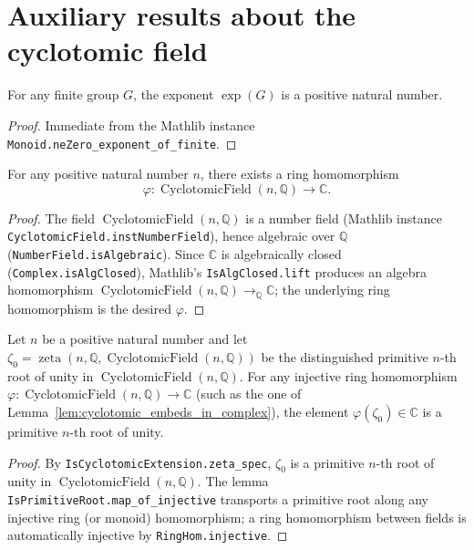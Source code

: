 \section{Auxiliary results about the cyclotomic field}

\begin{lemma}
    \label{lem:exponent_pos}
    For any finite group $G$, the exponent $\operatorname{exp}(G)$ is
    a positive natural number.
\end{lemma}
\begin{proof}
    Immediate from the Mathlib instance
    \texttt{Monoid.neZero\_exponent\_of\_finite}.
\end{proof}

\begin{lemma}
    \label{lem:cyclotomic_embeds_in_complex}
    For any positive natural number $n$, there exists a ring
    homomorphism
    \[
        \varphi : \operatorname{CyclotomicField}(n,\mathbb{Q})
            \longrightarrow \mathbb{C}.
    \]
\end{lemma}
\begin{proof}
    The field $\operatorname{CyclotomicField}(n,\mathbb{Q})$ is a
    number field (Mathlib instance
    \texttt{CyclotomicField.instNumberField}), hence algebraic over
    $\mathbb{Q}$ (\texttt{NumberField.isAlgebraic}). Since
    $\mathbb{C}$ is algebraically closed
    (\texttt{Complex.isAlgClosed}), Mathlib's
    \texttt{IsAlgClosed.lift} produces an algebra homomorphism
    $\operatorname{CyclotomicField}(n,\mathbb{Q}) \to_{\mathbb{Q}}
    \mathbb{C}$; the underlying ring homomorphism is the desired
    $\varphi$.
\end{proof}

\begin{lemma}
    \label{lem:image_zeta_is_primitive_root}
    Let $n$ be a positive natural number and let
    $\zeta_0 = \operatorname{zeta}(n,\mathbb{Q},\operatorname{CyclotomicField}(n,\mathbb{Q}))$
    be the distinguished primitive $n$-th root of unity in
    $\operatorname{CyclotomicField}(n,\mathbb{Q})$.  For any
    injective ring homomorphism
    $\varphi : \operatorname{CyclotomicField}(n,\mathbb{Q}) \to \mathbb{C}$
    (such as the one of
    Lemma~\ref{lem:cyclotomic_embeds_in_complex}), the element
    $\varphi(\zeta_0) \in \mathbb{C}$ is a primitive $n$-th root of
    unity.
\end{lemma}
\begin{proof}
    By \texttt{IsCyclotomicExtension.zeta\_spec},
    $\zeta_0$ is a primitive $n$-th root of unity in
    $\operatorname{CyclotomicField}(n,\mathbb{Q})$. The lemma
    \texttt{IsPrimitiveRoot.map\_of\_injective} transports a
    primitive root along any injective ring (or monoid) homomorphism;
    a ring homomorphism between fields is automatically injective by
    \texttt{RingHom.injective}.
\end{proof}

